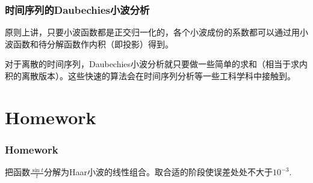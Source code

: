 \documentclass[CJK]{beamer}
\begin{document}
\begin{frame}
  \frametitle{时间序列的Daubechies小波分析}
  原则上讲，只要小波函数都是正交归一化的，各个小波成份的系数都可以通过用小波函数和待分解函数作内积（即投影）得到。

  \skiplines
  
  对于离散的时间序列，Daubechies小波分析就只要做一些简单的求和（相当于求内积的离散版本）。这些快速的算法会在时间序列分析等一些工科学科中接触到。
  
\end{frame}



\section{Homework}

\begin{frame}
  \frametitle{Homework}
  
  \bitem
\item{把函数$\frac{\sin t}{t}$分解为Haar小波的线性组合。取合适的阶段使误差处处不大于$10^{-3}$.}
  \eitem
  
\end{frame}



\ech
\end{document}
